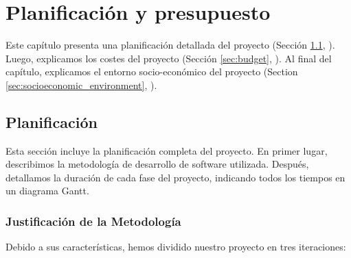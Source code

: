 \chead[]{}
\renewcommand{\headrulewidth}{0.5pt}

\lfoot[]{}
\cfoot[]{}
\rfoot[]{}
\renewcommand{\footrulewidth}{0pt}

\chapter{Planificación y presupuesto}
\label{ch:planning_and_budget}

Este capítulo presenta una planificación detallada del proyecto (Sección \ref{sec:planning}, \textit{}). Luego, explicamos los costes del proyecto (Sección \ref{sec:budget}, \textit{}). Al final del capítulo, explicamos el entorno socio-económico del proyecto ({Section \ref{sec:socioeconomic_environment}, \textit{}}).

\section{Planificación}
\label{sec:planning}

Esta sección incluye la planificación completa del proyecto. En primer lugar, describimos la metodología de desarrollo de software utilizada. Después, detallamos la duración de cada fase del proyecto, indicando todos los tiempos en un diagrama Gantt.

\subsection{Justificación de la Metodología}

Debido a sus características, hemos dividido nuestro proyecto en tres iteraciones:

